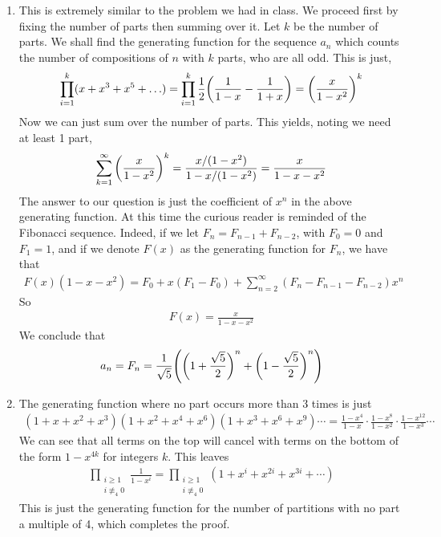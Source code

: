 \documentclass[12pt]{article}
\theoremstyle{definitionstyle}
\begin{document}
\begin{enumerate}[leftmargin=\labelsep]
	\item This is extremely similar to the problem we had in class. We proceed first by fixing the number of parts then summing over it. Let $k$ be the number of parts. We shall find the generating function for the sequence $a_n$ which counts the number of compositions of $n$ with $k$ parts, who are all odd. This is just,
	\begin{align*}
		\prod_{i=1}^k (x+x^3+x^5+\ldots) = \prod_{i=1}^k \frac12\qty(\frac{1}{1-x} - \frac{1}{1+x}) = \qty(\frac{x}{1-x^2})^k
	\end{align*}
	Now we can just sum over the number of parts. This yields, noting we need at least 1 part,
	\begin{align*}
		\sum_{k=1}^\infty \qty(\frac{x}{1-x^2})^k = \frac{x/(1-x^2)}{1-x/(1-x^2)} = \frac{x}{1-x-x^2}
	\end{align*}
	The answer to our question is just the coefficient of $x^n$ in the above generating function. At this time the curious reader is reminded of the Fibonacci sequence. Indeed, if we let $F_n = F_{n-1} + F_{n-2}$, with $F_0 = 0$ and $F_1 = 1$, and if we denote $F(x)$ as the generating function for $F_n$, we have that
	\begin{align*}
		F(x)(1-x-x^2) = F_0 + x(F_1-F_0) + \sum_{n=2}^\infty (F_n-F_{n-1}-F_{n-2})x^n
	\end{align*} 
	So \begin{align*}
		F(x) = \frac{x}{1-x-x^2}
	\end{align*}
	We conclude that 
	\begin{align*}
		a_n = F_n = \frac1{\sqrt{5}}\qty(\qty(1+\frac{\sqrt{5}}2)^n + \qty(1-\frac{\sqrt{5}}2)^n)
	\end{align*}
	\item The generating function where no part occurs more than 3 times is just
	\begin{align*}
		(1+x+x^2+x^3)(1+x^2+x^4+x^6)(1+x^3+x^6+x^9) \cdots = \frac{1-x^4}{1-x} \cdot \frac{1-x^8}{1-x^2} \cdot \frac{1-x^{12}}{1-x^3} \cdots
	\end{align*}
	We can see that all terms on the top will cancel with terms on the bottom of the form $1-x^{4k}$ for integers $k$. This leaves
	\begin{align*}
		\prod_{\substack{i \geq 1 \\ i \not \equiv_4 0}} \frac{1}{1-x^i} = \prod_{\substack{i \geq 1 \\ i \not \equiv_4 0}} (1+x^i+x^{2i}+x^{3i} + \cdots)
	\end{align*}This is just the generating function for the number of partitions with no part a multiple of 4, which completes the proof.
	\end{enumerate}
\end{document}
